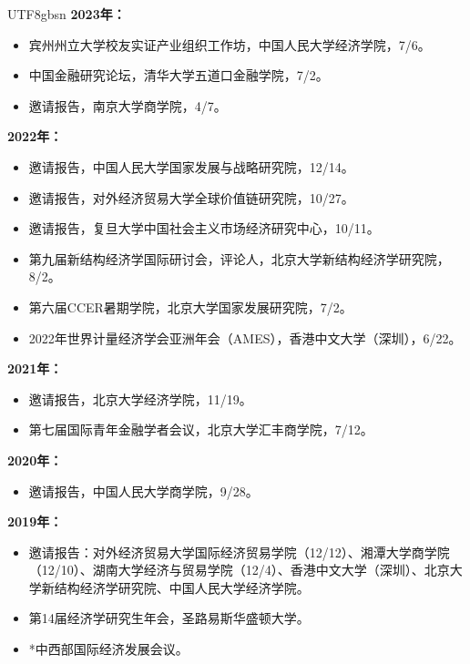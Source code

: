 \documentclass[letterpaper]{article}
\begin{document}
\begin{CJK}{UTF8}{gbsn}
\textbf{2023年：}
\begin{itemize}[leftmargin=1.6em, itemsep=0.25em, topsep=0.2em]
  \item 宾州州立大学校友实证产业组织工作坊，中国人民大学经济学院，7/6。
  \item 中国金融研究论坛，清华大学五道口金融学院，7/2。
  \item 邀请报告，南京大学商学院，4/7。
\end{itemize}

\textbf{2022年：}
\begin{itemize}[leftmargin=1.6em, itemsep=0.25em, topsep=0.2em]
  \item 邀请报告，中国人民大学国家发展与战略研究院，12/14。
  \item 邀请报告，对外经济贸易大学全球价值链研究院，10/27。
  \item 邀请报告，复旦大学中国社会主义市场经济研究中心，10/11。
  \item 第九届新结构经济学国际研讨会，评论人，北京大学新结构经济学研究院，8/2。
  \item 第六届CCER暑期学院，北京大学国家发展研究院，7/2。
  \item 2022年世界计量经济学会亚洲年会（AMES），香港中文大学（深圳），6/22。
\end{itemize}

\textbf{2021年：}
\begin{itemize}[leftmargin=1.6em, itemsep=0.25em, topsep=0.2em]
  \item 邀请报告，北京大学经济学院，11/19。
  \item 第七届国际青年金融学者会议，北京大学汇丰商学院，7/12。
\end{itemize}

\textbf{2020年：}
\begin{itemize}[leftmargin=1.6em, itemsep=0.25em, topsep=0.2em]
  \item 邀请报告，中国人民大学商学院，9/28。
\end{itemize}

\textbf{2019年：}
\begin{itemize}[leftmargin=1.6em, itemsep=0.25em, topsep=0.2em]
  \item 邀请报告：对外经济贸易大学国际经济贸易学院（12/12）、湘潭大学商学院（12/10）、湖南大学经济与贸易学院（12/4）、香港中文大学（深圳）、北京大学新结构经济学研究院、中国人民大学经济学院。
  \item 第14届经济学研究生年会，圣路易斯华盛顿大学。
  \item *中西部国际经济发展会议。
\end{itemize}


\end{CJK}
\end{document}
